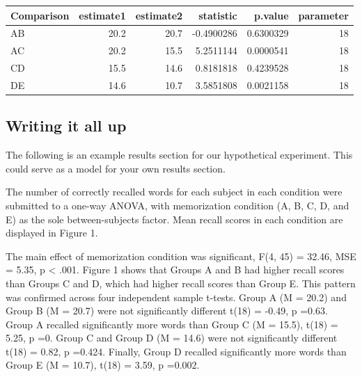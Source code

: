 \begin{tabular}{l|r|r|r|r|r}
\hline
Comparison & estimate1 & estimate2 & statistic & p.value & parameter\\
\hline
AB & 20.2 & 20.7 & -0.4900286 & 0.6300329 & 18\\
\hline
AC & 20.2 & 15.5 & 5.2511144 & 0.0000541 & 18\\
\hline
CD & 15.5 & 14.6 & 0.8181818 & 0.4239528 & 18\\
\hline
DE & 14.6 & 10.7 & 3.5851808 & 0.0021158 & 18\\
\hline
\end{tabular}

\subsection{Writing it all up}\label{writing-it-all-up}

The following is an example results section for our hypothetical
experiment. This could serve as a model for your own results section.

The number of correctly recalled words for each subject in each
condition were submitted to a one-way ANOVA, with memorization condition
(A, B, C, D, and E) as the sole between-subjects factor. Mean recall
scores in each condition are displayed in Figure 1.

The main effect of memorization condition was significant, F(4, 45) =
32.46, MSE = 5.35, p \textless{} .001. Figure 1 shows that Groups A and
B had higher recall scores than Groups C and D, which had higher recall
scores than Group E. This pattern was confirmed across four independent
sample t-tests. Group A (M = 20.2) and Group B (M = 20.7) were not
significantly different t(18) = -0.49, p =0.63. Group A recalled
significantly more words than Group C (M = 15.5), t(18) = 5.25, p =0.
Group C and Group D (M = 14.6) were not significantly different t(18) =
0.82, p =0.424. Finally, Group D recalled significantly more words than
Group E (M = 10.7), t(18) = 3.59, p =0.002.


